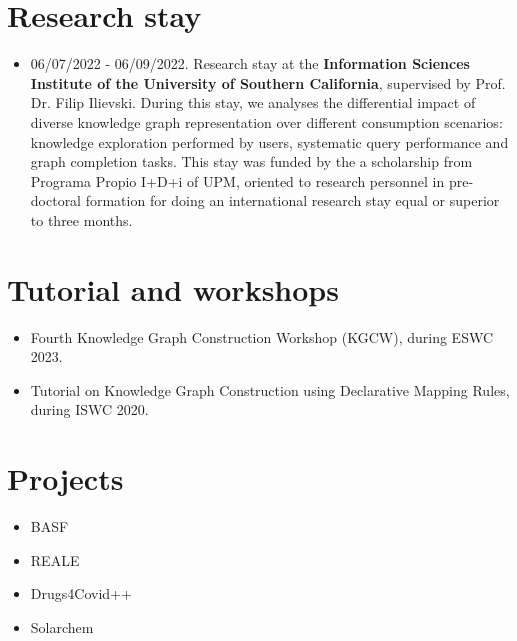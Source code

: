 \section{Research stay}
\begin{itemize}
    \item 06/07/2022 - 06/09/2022. Research stay at the \textbf{Information Sciences Institute of the University of Southern California}, supervised by Prof. Dr. Filip Ilievski. During this stay, we analyses the differential impact of diverse knowledge graph representation over different consumption scenarios: knowledge exploration performed by users, systematic query performance and graph completion tasks. This stay was funded by the a scholarship from Programa Propio I+D+i of UPM, oriented to research personnel in pre-doctoral formation for doing an international research stay equal or superior to three months.
\end{itemize}

\section{Tutorial and workshops}
\begin{itemize}
    \item Fourth Knowledge Graph Construction Workshop (KGCW), during ESWC 2023. 

    \item Tutorial on Knowledge Graph Construction using Declarative Mapping Rules, during ISWC 2020.
\end{itemize}

\section{Projects}
\begin{itemize}
    \item BASF

    \item REALE

    \item Drugs4Covid++

    \item Solarchem
\end{itemize}
